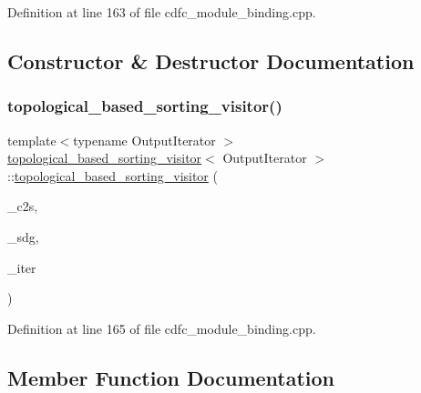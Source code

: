 Definition at line 163 of file cdfc\+\_\+module\+\_\+binding.\+cpp.



\subsection{Constructor \& Destructor Documentation}
\mbox{\label{structtopological__based__sorting__visitor_a6c4cae5c275b7c30bc37362e3a428d3e}} 
\subsubsection{\texorpdfstring{topological\+\_\+based\+\_\+sorting\+\_\+visitor()}{topological\_based\_sorting\_visitor()}}
{\footnotesize\ttfamily template$<$typename Output\+Iterator $>$ \\
\hyperlink{structtopological__based__sorting__visitor}{topological\+\_\+based\+\_\+sorting\+\_\+visitor}$<$ Output\+Iterator $>$\+::\hyperlink{structtopological__based__sorting__visitor}{topological\+\_\+based\+\_\+sorting\+\_\+visitor} (\begin{DoxyParamCaption}\item[{std\+::vector$<$ \hyperlink{graph_8hpp_abefdcf0544e601805af44eca032cca14}{vertex} $>$ \&}]{\+\_\+c2s,  }\item[{const \hyperlink{op__graph_8hpp_a9a0b240622c47584bee6951a6f5de746}{Op\+Graph\+Const\+Ref}}]{\+\_\+sdg,  }\item[{Output\+Iterator}]{\+\_\+iter }\end{DoxyParamCaption})\hspace{0.3cm}{\ttfamily [inline]}}



Definition at line 165 of file cdfc\+\_\+module\+\_\+binding.\+cpp.



\subsection{Member Function Documentation}
\mbox{\label{structtopological__based__sorting__visitor_abd9e4aba1cc1762372f6eda9c3c873fb}} 
